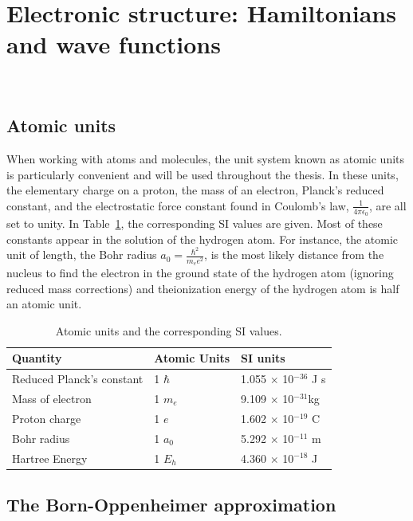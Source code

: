 \documentclass[11pt,oneside,final]{huthesis}%
\begin{document}
\section{Electronic structure: Hamiltonians and wave functions}~\label{sec:ham_wf}
\subsection{Atomic units}

When working with atoms and molecules, the unit system known as atomic units is particularly convenient and will be used throughout the thesis.  In these units, the elementary charge on a proton, the mass of an electron, Planck's reduced constant, and the electrostatic force constant found in Coulomb's law, $\frac{1}{4 \pi \epsilon_0}$, are all set to unity.   In Table~\ref{tbl:1}, the corresponding SI values are given.  Most of these constants appear in the solution of the hydrogen atom.  For instance, the atomic unit of length, the Bohr radius $a_0=\frac{{\hbar }^2}{m_ee^2}$, is the most likely distance from the nucleus to find the electron in the ground state of the hydrogen atom (ignoring reduced mass corrections) and theionization energy of the hydrogen atom is half an atomic unit.


\begin{table}
	\begin{center}
\begin{tabular}{lll} \hline 
\textbf{Quantity} & \textbf{Atomic Units} & \textbf{SI units} \\ \hline 
Reduced Planck's constant & 1 $\hbar $ & 1.055 $\times$ 10${}^{-36}$ J s \\[1.2ex] 
Mass of electron & 1 $m_{e}$ & 9.109 $\times$ 10${}^{-31 }$kg \\[1.2ex]
Proton charge & 1 $e$ & 1.602 $\times$ 10${}^{-19}$ C \\[1.2ex]
Bohr radius & 1 ${{ a}}_0$ & 5.292 $\times$ 10${}^{-11}$ m \\[1.2ex]
Hartree Energy  & 1 ${E}_{h}$ & 4.360 $\times$ 10${}^{-18}$ J \\ \hline 
\end{tabular}
\label{tbl:1}
\caption{Atomic units and the corresponding SI values.}
	\end{center}
\end{table}


\subsection{The Born-Oppenheimer approximation}\label{sec:BOA}
\end{document}
